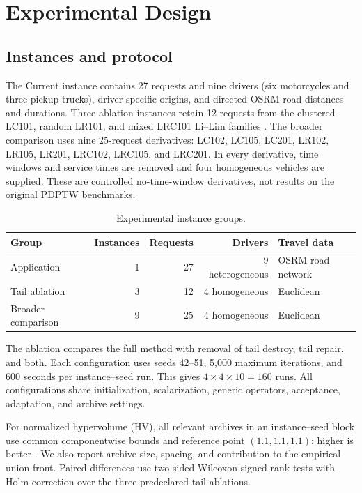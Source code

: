 \documentclass[11pt,a4paper]{article}
\begin{document}
\section{Experimental Design}

\subsection{Instances and protocol}

The Current instance contains 27 requests and nine drivers (six motorcycles and
three pickup trucks), driver-specific origins, and directed OSRM road distances
and durations. Three ablation instances retain 12 requests from the clustered
LC101, random LR101, and mixed LRC101 Li--Lim families
\cite{li2003metaheuristic}. The broader comparison uses nine 25-request
derivatives: LC102, LC105, LC201, LR102, LR105, LR201, LRC102, LRC105, and
LRC201. In every derivative, time windows and service times are removed and
four homogeneous vehicles are supplied. These are controlled no-time-window
derivatives, not results on the original PDPTW benchmarks.

\begin{table}[tbp]
\centering
\caption{Experimental instance groups.}
\label{tab:instances}
\begin{tabular}{lrrrl}
\toprule
Group & Instances & Requests & Drivers & Travel data\\
\midrule
Application & 1 & 27 & 9 heterogeneous & OSRM road network\\
Tail ablation & 3 & 12 & 4 homogeneous & Euclidean\\
Broader comparison & 9 & 25 & 4 homogeneous & Euclidean\\
\bottomrule
\end{tabular}
\end{table}

The ablation compares the full method with removal of tail destroy, tail
repair, and both. Each configuration uses seeds 42--51, 5,000 maximum
iterations, and 600 seconds per instance--seed run. This gives
$4\times4\times10=160$ runs. All configurations share initialization,
scalarization, generic operators, acceptance, adaptation, and archive settings.

For normalized hypervolume (HV), all relevant archives in an instance--seed
block use common componentwise bounds and reference point $(1.1,1.1,1.1)$;
higher is better \cite{zitzler1999multiobjective}. We also report archive size,
spacing, and contribution to the empirical union front. Paired differences use
two-sided Wilcoxon signed-rank tests with Holm correction over the three
predeclared tail ablations.
\end{document}
